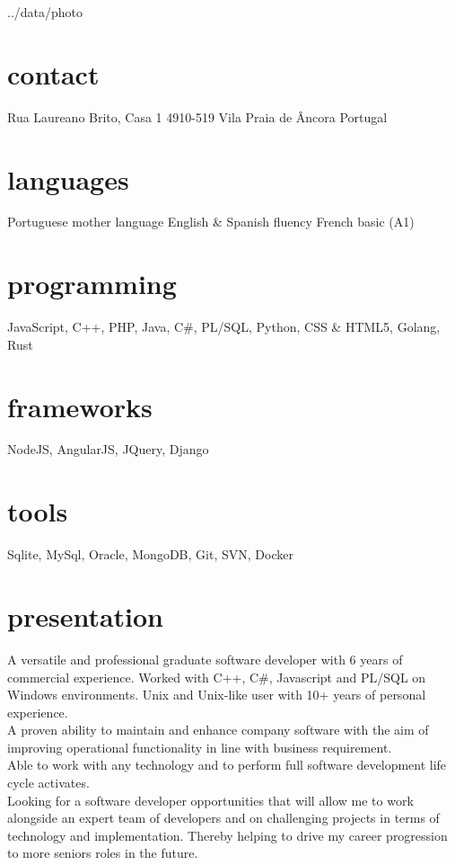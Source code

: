 \documentclass[]{friggeri-cv} %
\begin{document}


\begin{aside}{../data/photo} %
\section{contact}
Rua Laureano Brito, Casa 1
4910-519 Vila Praia de \^Ancora
Portugal
~
~
\section{languages}
Portuguese mother language
English \& Spanish fluency
French basic (A1)
\section{programming}
JavaScript,
C++, PHP, Java,
C\#, PL/SQL, Python,
CSS \& HTML5, Golang,
Rust
\section{frameworks}
NodeJS, AngularJS,
JQuery, Django
\section{tools}
Sqlite, MySql,
Oracle, MongoDB,
Git, SVN,
Docker
\end{aside}


\section{presentation}
A versatile and professional graduate software developer with 6 years of commercial experience. Worked with C++, C\#, Javascript and PL/SQL on Windows environments. Unix and Unix-like user with 10+ years of personal experience. \\
A proven ability to maintain and enhance company software with the aim of improving operational functionality in line with business requirement. \\
Able to work with any technology and to perform full software development life cycle activates.\\
Looking for a software developer opportunities that will allow me to work alongside an expert team of developers and on challenging projects in terms of technology and  implementation. Thereby helping to drive my career progression to more seniors roles in the future.
\end{document}
